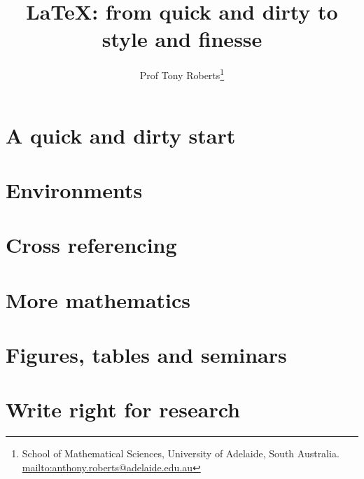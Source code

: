 \documentclass[a4paper,landscape,twocolumn]{article}
\begin{document}
\title{\LaTeX: from quick and dirty to style and finesse}
\author{Prof Tony Roberts\thanks{School of Mathematical Sciences, University of Adelaide, South Australia.
\protect\url{mailto:anthony.roberts@adelaide.edu.au}} } 

\maketitle


\section{A quick and dirty start}

\section{Environments}

\section{Cross referencing}

\section{More mathematics}

\section{Figures, tables and seminars}

\section{Write right for research}
\end{document}
